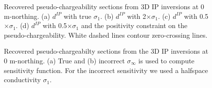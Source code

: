\documentclass[extra,mreferee]{gji}
\newcommand{\siginf}{\sigma_\infty}
\newcommand{\dip}{d^{IP}}
\begin{document}
\begin{figure}
  \caption{Recovered pseudo-chargeability sections from 3D IP inversions at 0 m-northing. (a) $\dip$ with true $\sigma_1$. (b) $\dip$ with 2$\times \sigma_1$. (c) $\dip$ with 0.5$\times \sigma_1$. (d) $\dip$ with 0.5$\times \sigma_1$ and the positivity constraint on the pseudo-chargeability. White dashed lines contour zero-crossing lines.}
  \label{F:Regional_IPInv}
\end{figure}



\begin{figure}
  \caption{Recovered pseudo-chargeabilty sections from the 3D IP inversions at 0 m-northing.  (a) True and (b) incorrect $\siginf$ is used to compute sensitivity function. For the incorrect sensitivity we used a halfspace conductivity $\sigma_1$.}
  \label{F:True_vs_approx_sensitivity}
\end{figure}
\end{document}
